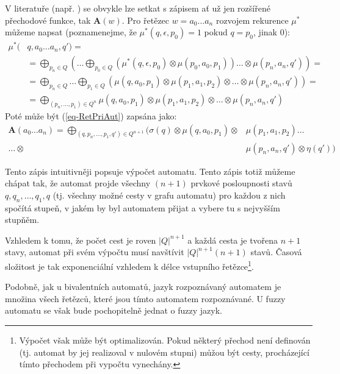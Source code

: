 \begin{note}
  V literatuře (např. \cite{SebJoh-InvFuzzAutInvFuzzLang, IgnCirBog-DetFuzAutMemValComResLat, Bel-DetFuzAut}) se obvykle lze setkat s  zápisem ať už jen rozšířené přechodové funkce, tak $\mathbf{A}(w)$. Pro řetězec $w = a_0 \dots a_n$ rozvojem rekurence $\mu^*$ můžeme napsat (poznamenejme, že $\mu^*(q, \epsilon, p_0) = 1$ pokud $q = p_0$, jinak $0$):
  \begin{align*}
   \mu^*(& q, a_0 \dots a_n, q') = \\
    &= \bigoplus_{p_n \in Q} \left( \dots \bigoplus_{p_0 \in Q} (\mu^*(q, \epsilon, p_0) \otimes \mu(p_0, a_0, p_1)) \dots \otimes \mu(p_n, a_n, q') \right) = \\
    &= \bigoplus_{p_n \in Q} \dots \bigoplus_{p_1 \in Q} \left( \mu(q, a_0, p_1) \otimes \mu(p_1, a_1, p_2) \otimes \dots \otimes \mu(p_n, a_n, q') \right) = \\
    &= \bigoplus_{(p_n,\dots, p_1) \in Q^n} \mu(q, a_0, p_1) \otimes \mu(p_1, a_1, p_2) \otimes \dots \otimes \mu(p_n, a_n, q')
  \end{align*}
  Poté může být (\ref{eq-RetPriAut}) zapsána jako:
  \begin{align*}
    \mathbf{A}(a_0 \dots a_n) 
    = \bigoplus_{(q, p_n,\dots, p_1, q') \in Q^{n+1}} (\sigma(q) \otimes \mu(q, a_0, p_1) \otimes &\mu(p_1, a_1, p_2) \dots \\
     \dots \otimes &\mu(p_n, a_n, q') \otimes \eta(q'))
  \end{align*}

  Tento zápis intuitivněji popsuje výpočet automatu. Tento zápis totiž můžeme chápat tak, že automat projde všechny $(n+1)$ prvkové posloupnosti stavů $q, q_n, \dots, q_1, q$ (tj. všechny možné cesty v grafu automatu) pro každou z nich spočítá stupeň, v jakém by byl automatem přijat a vybere tu s nejvyšším stupňěm.
  
  Vzhledem k tomu, že počet cest je roven $|Q|^{n+1}$ a každá cesta je tvořena $n+1$ stavy, automat při svém výpočtu musí navštívit $|Q|^{n+1}(n+1)$ stavů. Časová složitost je tak exponenciální vzhledem k délce vstupního řetězce\footnote{Výpočet však může být optimalizován. Pokud některý přechod není definován (tj. automat by jej realizoval v nulovém stupni) můžou být cesty, procházející tímto přechodem při vypočtu vynechány.}.
\end{note}

Podobně, jak u bivalentních automatů, jazyk rozpoznávaný automatem je množina všech řetězců, které jsou tímto automatem rozpoznávané. U fuzzy automatu se však bude pochopitelně jednat o fuzzy jazyk.

